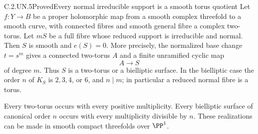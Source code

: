 \begin{statement}{C.2.UN.5}{Proved}{Every normal irreducible support is a smooth torus quotient}
Let $f:Y\to B$ be a proper holomorphic map from a smooth
complex threefold to a smooth curve, with connected fibres
and smooth general fibre a complex two-torus. Let $mS$ be
a full fibre whose reduced support is irreducible and normal.
Then $S$ is smooth and $e(S)=0$. More precisely, the
normalized base change $t=s^m$ gives a connected two-torus
$A$ and a finite unramified cyclic map
\[
                         A\longrightarrow S
\]
of degree $m$. Thus $S$ is a two-torus or a bielliptic
surface. In the bielliptic case the order $n$ of $K_S$ is
$2,3,4$, or $6$, and $n\mid m$; in particular a reduced
normal fibre is a torus.

Every two-torus occurs with every positive multiplicity.
Every bielliptic surface of canonical order $n$ occurs
with every multiplicity divisible by $n$. These
realizations can be made in smooth compact threefolds
over $\PP^1$.
\end{statement}
